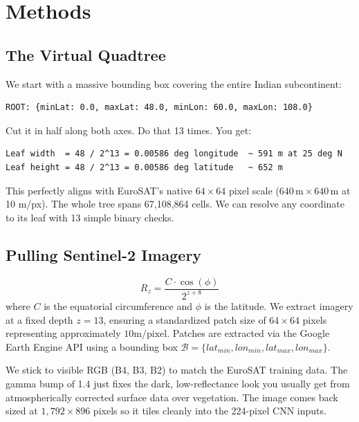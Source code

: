 \documentclass[journal]{IEEEtran}
\begin{document}
\section{Methods}

\subsection{The Virtual Quadtree}

We start with a massive bounding box covering the entire Indian
subcontinent:

\begin{verbatim}
ROOT: {minLat: 0.0, maxLat: 48.0, minLon: 60.0, maxLon: 108.0}
\end{verbatim}

Cut it in half along both axes. Do that 13 times. You get:

\begin{verbatim}
Leaf width  = 48 / 2^13 = 0.00586 deg longitude  ~ 591 m at 25 deg N
Leaf height = 48 / 2^13 = 0.00586 deg latitude   ~ 652 m
\end{verbatim}

This perfectly aligns with EuroSAT's native $64 \times 64$ pixel scale
($640\,\text{m} \times 640\,\text{m}$ at 10 m/px). The whole tree spans
67,108,864 cells. We can resolve any coordinate to its leaf with 13
simple binary checks.

\subsection{Pulling Sentinel-2 Imagery}

\begin{equation}
R_z = \frac{C \cdot \cos(\phi)}{2^{z+8}}
\end{equation}
\noindent where $C$ is the equatorial circumference and $\phi$ is the latitude. We extract imagery at a fixed depth $z=13$, ensuring a standardized patch size of $64 \times 64$ pixels representing approximately $10 \text{m}/\text{pixel}$. Patches are extracted via the Google Earth Engine API using a bounding box $\mathcal{B} = \{lat_{min}, lon_{min}, lat_{max}, lon_{max}\}$.


We stick to visible RGB (B4, B3, B2) to match the EuroSAT training data.
The gamma bump of 1.4 just fixes the dark, low-reflectance look you
usually get from atmospherically corrected surface data over vegetation.
The image comes back sized at $1{,}792 \times 896$ pixels so it tiles
cleanly into the 224-pixel CNN inputs.
\end{document}
